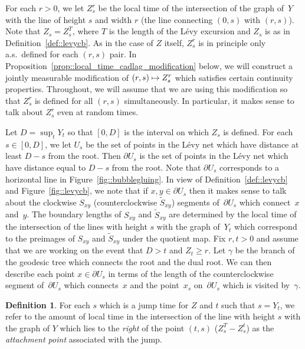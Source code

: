 \documentclass[JEP,XML,SOM,Unicode]{cedram}
\newcommand\mto{\mathchoice{\longmapsto}{\mapsto}{\mapsto}{\mapsto}}
\theoremstyle{plain}
\numberwithin{theorem}{section}
\theoremstyle{definition}
\newtheorem{definition}[theorem]{Definition}
\let\wt\widetilde
\begin{document}
For each $r > 0$, we let $Z_s^r$ be the local time of the intersection of the graph of~$Y$ with the line of height $s$ and width $r$ (\ie the line connecting $(0,s)$ with $(r,s)$). Note that $Z_s = Z_s^T$, where $T$ is the length of the Lévy excursion and $Z_s$ is as in Definition~\ref{def::levycb}. As in the case of $Z$ itself, $Z_s^r$ is in principle only a.s.\ defined for each $(r,s)$ pair. In Proposition~\ref{prop::local_time_cadlag_modification} below, we will construct a jointly measurable modification of $(r,s) \mto Z_s^r$ which satisfies certain continuity properties. Throughout, we will assume that we are using this modification so that $Z_s^r$ is defined for all $(r,s)$ simultaneously. In particular, it makes sense to talk about $Z_s^r$ even at random times.

Let $D = \sup_t Y_t$ so that $[0,D]$ is the interval on which $Z_s$ is defined. For each $s \in [0,D]$, we let $U_s$ be the set of points in the Lévy net which have distance at least $D-s$ from the root. Then $\partial U_s$ is the set of points in the Lévy net which have distance equal to $D-s$ from the root. Note that $\partial U_s$ corresponds to a horizontal line in Figure~\ref{fig::bubblegluing}. In view of Definition~\ref{def::levycb} and Figure~\ref{fig::levycb}, we note that if $x,y \in \partial U_s$ then it makes sense to talk about the clockwise $S_{xy}$ (\resp counterclockwise $\wt{S}_{xy}$) segments of~$\partial U_s$ which connect~$x$ and~$y$. The boundary lengths of $S_{xy}$ and $\wt{S}_{xy}$ are determined by the local time of the intersection of the lines with height $s$ with the graph of~$Y_t$ which correspond to the preimages of $S_{xy}$ and $\wt{S}_{xy}$ under the quotient map. Fix $r,t > 0$ and assume that we are working on the event that $D > t$ and $Z_t \geq r$. Let $\gamma$ be the branch of the geodesic tree which connects the root and the dual root. We can then describe each point $x \in \partial U_s$ in terms of the length of the counterclockwise segment of~$\partial U_s$ which connects~$x$ and the point~$x_s$ on~$\partial U_s$ which is visited by~$\gamma$.

\begin{definition}
\label{def::levy_attachment_points}
For each $s$ which is a jump time for $Z$ and $t$ such that $s = Y_t$, we refer to the amount of local time in the intersection of the line with height $s$ with the graph of $Y$ which lies to the \emph{right} of the point $(t,s)$ (\ie $Z_s^T - Z_s^t$) as the \emph{attachment point} associated with the jump.
\end{definition}
\end{document}
